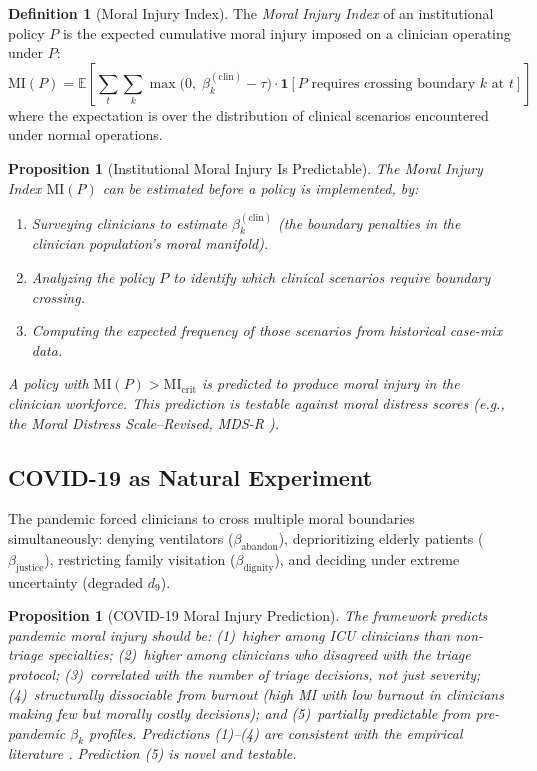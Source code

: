 \documentclass[12pt]{article}
\newtheorem{proposition}[theorem]{Proposition}
\theoremstyle{definition}
\newtheorem{definition}[theorem]{Definition}
\theoremstyle{remark}
\newcommand{\MI}{\mathrm{MI}}              %
\begin{document}
\begin{definition}[Moral Injury Index]
\label{def:mi_index}
The \emph{Moral Injury Index} of an institutional policy $P$ is the expected cumulative moral injury imposed on a clinician operating under $P$:
\begin{equation}
\MI(P) = \mathbb{E}\left[\sum_{t} \sum_k \max\bigl(0,\; \beta_k^{(\text{clin})} - \tau\bigr) \cdot \mathbf{1}[P \text{ requires crossing boundary } k \text{ at } t]\right]
\label{eq:mi_index}
\end{equation}
where the expectation is over the distribution of clinical scenarios encountered under normal operations.
\end{definition}

\begin{proposition}[Institutional Moral Injury Is Predictable]
\label{prop:mi_predictable}
The Moral Injury Index $\MI(P)$ can be estimated \emph{before} a policy is implemented, by:
\begin{enumerate}
    \item Surveying clinicians to estimate $\beta_k^{(\text{clin})}$ (the boundary penalties in the clinician population's moral manifold).
    \item Analyzing the policy $P$ to identify which clinical scenarios require boundary crossing.
    \item Computing the expected frequency of those scenarios from historical case-mix data.
\end{enumerate}
A policy with $\MI(P) > \MI_{\text{crit}}$ is predicted to produce moral injury in the clinician workforce.  This prediction is testable against moral distress scores (e.g., the Moral Distress Scale--Revised, MDS-R \cite{hamric2012}).
\end{proposition}

\subsection{COVID-19 as Natural Experiment}

The pandemic forced clinicians to cross multiple moral boundaries simultaneously: denying ventilators ($\beta_{\text{abandon}}$), deprioritizing elderly patients ($\beta_{\text{justice}}$), restricting family visitation ($\beta_{\text{dignity}}$), and deciding under extreme uncertainty (degraded $d_9$).

\begin{proposition}[COVID-19 Moral Injury Prediction]
\label{prop:covid_mi}
The framework predicts pandemic moral injury should be: (1)~higher among ICU clinicians than non-triage specialties; (2)~higher among clinicians who disagreed with the triage protocol; (3)~correlated with the \emph{number} of triage decisions, not just severity; (4)~structurally dissociable from burnout (high MI with low burnout in clinicians making few but morally costly decisions); and (5)~partially predictable from pre-pandemic $\beta_k$ profiles.  Predictions (1)--(4) are consistent with the empirical literature \cite{greenberg2020,rushton2018}.  Prediction (5) is novel and testable.
\end{proposition}
\end{document}

